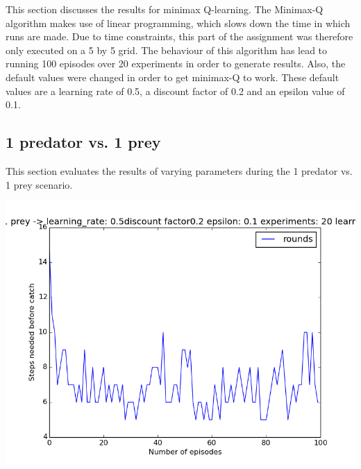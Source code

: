 This section discusses the results for minimax Q-learning. The Minimax-Q algorithm makes use of linear programming, which slows down the time in which runs are made. Due to time constraints, this part of the assignment was therefore only executed on a 5 by 5 grid. 
The behaviour of this algorithm has lead to running 100 episodes over 20 experiments in order to generate results. Also, the default values were changed in order to get minimax-Q to work. These default values are a learning rate of 0.5, a discount factor of 0.2 and an epsilon value of 0.1.

\subsection{1 predator vs. 1 prey}
This section evaluates the results of varying parameters during the 1 predator vs. 1 prey scenario.
\begin{center}
	\includegraphics[scale=0.3]{minimax_100rounds_20exp_disc02_alpha05}
	\label{graph:1vs1_disc_02}
\end{center}

